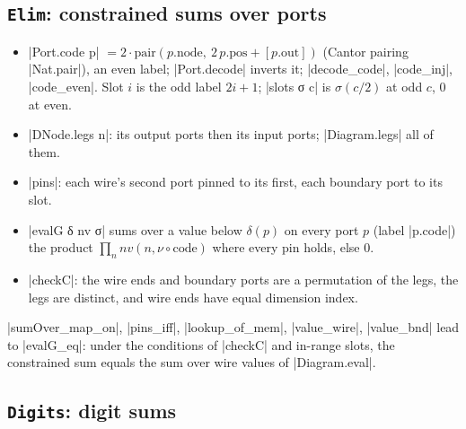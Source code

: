 \subsection{\texttt{Elim}: constrained sums over ports}

\begin{itemize}
\item \lean|Port.code p| $=2\cdot\mathrm{pair}(p.\mathrm{node},\ 2\,p.\mathrm{pos}+[p.\mathrm{out}])$ (Cantor pairing
  \lean|Nat.pair|), an even label; \lean|Port.decode| inverts it; \lean|decode_code|, \lean|code_inj|,
  \lean|code_even|. Slot $i$ is the odd label $2i+1$; \lean|slots σ c| is $\sigma(c/2)$ at odd $c$, $0$
  at even.
\item \lean|DNode.legs n|: its output ports then its input ports; \lean|Diagram.legs| all of them.
\item \lean|pins|: each wire's second port pinned to its first, each boundary port to its slot.
\item \leanLLone|evalG δ nv σ| sums over a value below $\delta(p)$ on every port $p$ (label
  \lean|p.code|) the product $\prod_n nv(n,\nu\circ\mathrm{code})$ where every pin holds, else $0$.
\item \lean|checkC|: the wire ends and boundary ports are a permutation of the legs, the legs are
  distinct, and wire ends have equal dimension index.
\end{itemize}
\lean|sumOver_map_on|, \lean|pins_iff|, \lean|lookup_of_mem|, \lean|value_wire|, \lean|value_bnd| lead
to \lean|evalG_eq|: under the conditions of \lean|checkC| and in-range slots, the constrained sum
equals the sum over wire values of \lean|Diagram.eval|.

\subsection{\texttt{Digits}: digit sums}


